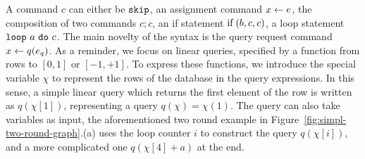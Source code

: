   A command $c$ can either be $\mathtt{skip}$, an assignment command $\mathrel{ x \leftarrow e }$, the composition of two commands $c;c$, an if statement $\mbox{if\;}(b, c, c)$, a loop statement  $\mathtt{loop} ~ a ~ \mathtt{do} ~ c $.
 The main novelty of the syntax is the query request command $\mathrel{ x \leftarrow q(e_q) }$.  As a reminder, we focus on linear queries, specified by a function from rows to $[0,1]$ or $[-1,+1]$. To express these functions, we introduce the special variable $\chi$ to represent the rows of the database in the query expressions. In this sense, a simple linear query which returns the first element of the row is written as $q(\chi[1])$, representing a query $q(\chi) = \chi(1)$. The query can also take variables as input, the aforementioned two round example in Figure~\ref{fig:simpl-two-round-graph}.(a) uses the loop counter $i$ to construct the query $q(\chi[i])$, and a more complicated one $q(\chi[4]+a)$ at the end.  
 
 



 
 
 

